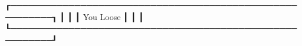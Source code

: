 ┎─────────────────────────────────────────────────────────┒
┃                                                         ┃
┃                        You Loose                        ┃
┃                                                         ┃
┖─────────────────────────────────────────────────────────┚